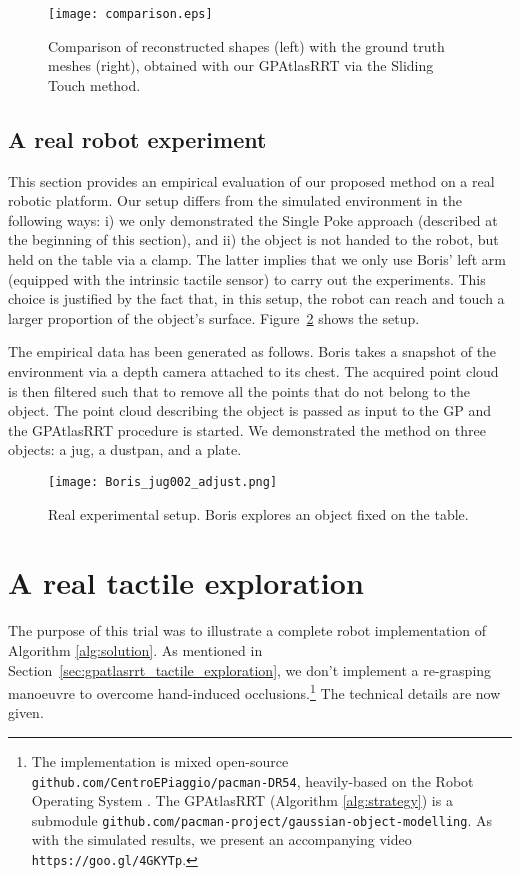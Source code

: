 \begin{figure}[htb]
    \centering
    \texttt{[image: comparison.eps]}
    \caption{Comparison of reconstructed shapes (left) with the ground truth meshes (right), obtained with our GPAtlasRRT via the Sliding Touch method.}
    \label{fig:shapecomp}
\end{figure}


\subsection{A real robot experiment}
\label{sec:real}

This section provides an empirical evaluation of our proposed method on a real robotic platform. Our setup differs from the simulated environment in the following ways: i) we only demonstrated the Single Poke approach (described at the beginning of this section), and ii) the object is not handed to the robot, but held on the table via a clamp. The latter implies that we only use Boris' left arm (equipped with the intrinsic tactile sensor) to carry out the experiments. This choice is justified by the fact that, in this setup, the robot can reach and touch a larger proportion of the object's surface. Figure~\ref{fig:boris} shows the setup.

The empirical data has been generated as follows. Boris takes a snapshot of the environment via a depth camera attached to its chest. The acquired point cloud is then filtered such that to remove all the points that do not belong to the object. The point cloud describing the object is passed as input to the GP and the GPAtlasRRT procedure is started. We demonstrated the method on three objects: a jug, a dustpan, and a plate. 

\begin{figure}[htb]
    \centering
    \texttt{[image: Boris\_jug002\_adjust.png]}
    \caption{Real experimental setup. Boris explores an object fixed on the table.}
    \label{fig:boris}
\end{figure}

\section{A real tactile exploration}
\label{sec:vito}

The purpose of this trial was to illustrate a complete robot implementation of Algorithm \ref{alg:solution}. As mentioned in Section~\ref{sec:gpatlasrrt_tactile_exploration}, we don't implement a re-grasping manoeuvre to overcome hand-induced occlusions.\footnote{The implementation is mixed open-source \texttt{github.com/CentroEPiaggio/pacman-DR54}, heavily-based on the Robot Operating System \cite{ROS}. The GPAtlasRRT (Algorithm \ref{alg:strategy}) is a submodule \texttt{github.com/pacman-project/gaussian-object-modelling}. As with the simulated results, we present an accompanying video \texttt{https://goo.gl/4GKYTp}.} The technical details are now given.

